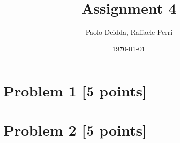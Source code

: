\documentclass[12pt]{article}
\author{Paolo Deidda, Raffaele Perri}
\date{\today}
\begin{document}
\title{Assignment 4}
\maketitle

\section*{Problem 1 [5 points]}


\newpage

\section*{Problem 2 [5 points]}

\end{document}
